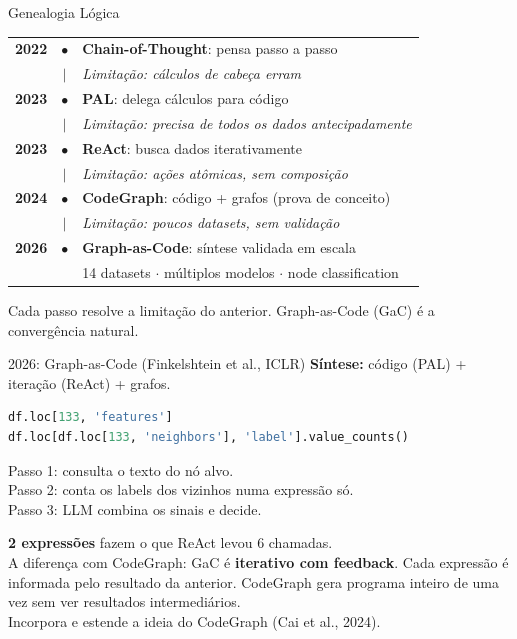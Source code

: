 \documentclass{beamer}
\begin{document}
\begin{frame}{Genealogia  Lógica}
  \begin{center}
    \footnotesize
    \begin{tabular}{rcp{7.5cm}}
      \textbf{2022} & $\bullet$ & \textbf{Chain-of-Thought}: pensa passo a passo \\
      & $|$ & \emph{Limitação: cálculos de cabeça erram} \\[0.4em]
      \textbf{2023} & $\bullet$ & \textbf{PAL}: delega cálculos para código \\
      & $|$ & \emph{Limitação: precisa de todos os dados antecipadamente} \\[0.4em]
      \textbf{2023} & $\bullet$ & \textbf{ReAct}: busca dados iterativamente \\
      & $|$ & \emph{Limitação: ações atômicas, sem composição} \\[0.4em]
      \textbf{2024} & $\bullet$ & \textbf{CodeGraph}: código + grafos (prova de conceito) \\
      & $|$ & \emph{Limitação: poucos datasets, sem validação} \\[0.4em]
      \textbf{2026} & $\bullet$ & \textbf{Graph-as-Code}: síntese validada em escala \\
      & & 14 datasets $\cdot$ múltiplos modelos $\cdot$ node classification \\
    \end{tabular}
  \end{center}

  \vspace{0.5em}
  Cada passo resolve a limitação do anterior. Graph-as-Code (GaC) é a convergência natural.
\end{frame}

\begin{frame}[fragile]{2026: Graph-as-Code (Finkelshtein et al., ICLR)}
  \textbf{Síntese:} código (PAL) + iteração (ReAct) + grafos.

  \vspace{0.3em}
  \begin{lstlisting}[language=Python, basicstyle=\ttfamily\scriptsize]
df.loc[133, 'features']
df.loc[df.loc[133, 'neighbors'], 'label'].value_counts()
  \end{lstlisting}

  \vspace{0.3em}
  Passo 1: consulta o texto do nó alvo.\\
  Passo 2: conta os labels dos vizinhos numa expressão só.\\
  Passo 3: LLM combina os sinais e decide.

  \vspace{0.5em}
  \textbf{2 expressões} fazem o que ReAct levou 6 chamadas.\\
  A diferença com CodeGraph: GaC é \textbf{iterativo com feedback}. Cada expressão é informada pelo resultado da anterior. CodeGraph gera programa inteiro de uma vez sem ver resultados intermediários.\\
  Incorpora e estende a ideia do CodeGraph (Cai et al., 2024).
\end{frame}
\end{document}
